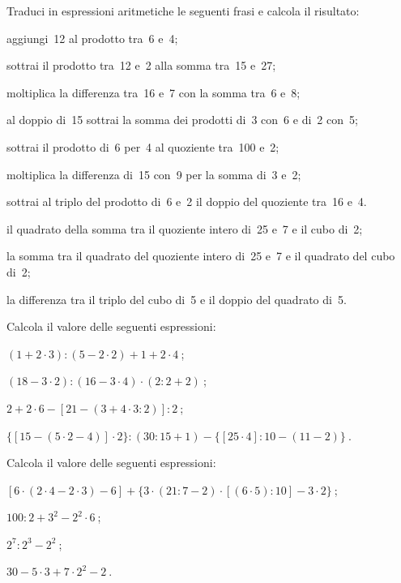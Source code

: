 \begin{esercizio}[\Ast]
Traduci in espressioni aritmetiche le seguenti frasi e calcola il risultato:
 \begin{enumeratea}
 \item aggiungi~12 al prodotto tra~6 e~4;
 \item sottrai il prodotto tra~12 e~2 alla somma tra~15 e~27;
 \item moltiplica la differenza tra~16 e~7 con la somma tra~6 e~8;
 \item al doppio di~15 sottrai la somma dei prodotti di~3 con~6 e di~2 con~5;
 \item sottrai il prodotto di~6 per~4 al quoziente tra~100 e~2;
 \item moltiplica la differenza di~15 con~9 per la somma di~3 e~2;
 \item sottrai al triplo del prodotto di~6 e~2 il doppio del quoziente tra~16 e~4.
 \item il quadrato della somma tra il quoziente intero di~25 e~7 e il cubo di~2;
 \item la somma tra il quadrato del quoziente intero di~25 e~7 e il quadrato del cubo di~2;
 \item la differenza tra il triplo del cubo di~5 e il doppio del quadrato di~5.
 \end{enumeratea}
\end{esercizio}

\begin{esercizio}[\Ast]
 Calcola il valore delle seguenti espressioni:
 \begin{enumeratea}
 \item $(1+2\cdot3):(5-2\cdot2)+1+2\cdot4~$;
 \item $ (18-3\cdot2):(16-3\cdot4)\cdot(2:2+2)~$;
 \item $2+2\cdot6-[21-(3+4\cdot 3:2)]:2~$;
 \item $\lbrace[15-(5\cdot2-4)]\cdot2\rbrace:(30:15+1)-\lbrace[25\cdot4]:10-(11-2)\rbrace~$.
 \end{enumeratea}
\end{esercizio}

\begin{esercizio}[\Ast]
 Calcola il valore delle seguenti espressioni:
 \begin{enumeratea}
 \item $[6\cdot(2\cdot4-2\cdot3)-6]+\lbrace3\cdot(21:7-2)\cdot[(6\cdot5):10]-3\cdot2\rbrace~$;
 \item $100:2+3^2-2^2\cdot6~$;
 \item $2^7:2^3-2^2~$;
 \item $30-5\cdot3+7\cdot2^2-2~$.
 \end{enumeratea}
\end{esercizio}

